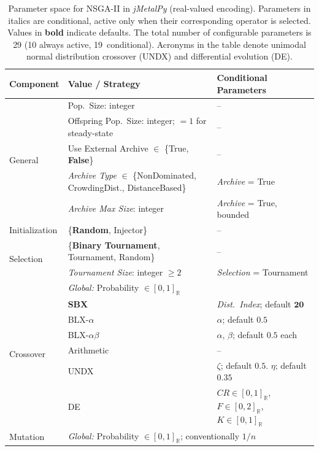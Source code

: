 \documentclass[journal]{IEEEtran}
\newcommand{\Realdomain}[1]{[#1]_{\mathbb{R}}}
\begin{document}
\begin{table}[htbp]
\centering
\caption{Parameter space for NSGA-II in \textit{jMetalPy} (real-valued encoding). Parameters in italics are conditional, active only when their corresponding operator is selected. Values in \textbf{bold} indicate defaults. The total number of configurable parameters is 29 (10 always active, 19~conditional). Acronyms in the table denote unimodal normal distribution crossover (UNDX) and differential evolution (DE).}
\label{tab:parameter_space_jmetalpy}
\begin{tabular}{lll}
\toprule
\textbf{Component} & \textbf{Value / Strategy} & \textbf{Conditional Parameters} \\ \midrule
\multirow{5}{*}{General} & Pop.\ Size: integer & -- \\
 & Offspring Pop.\ Size: integer; $= 1$ for steady-state & -- \\
 & Use External Archive $\in$ \{True, \textbf{False}\} & -- \\
 & \textit{Archive Type} $\in$ \{NonDominated, CrowdingDist., DistanceBased\} & \textit{Archive} = True \\
 & \textit{Archive Max Size}: integer & \textit{Archive} = True, bounded \\ \midrule
\multirow{1}{*}{Initialization} & \{\textbf{Random}, Injector\} & -- \\ \midrule
\multirow{2}{*}{Selection} & \{\textbf{Binary Tournament}, Tournament, Random\} & -- \\
 & \textit{Tournament Size}: integer $\geq 2$ & \textit{Selection} = Tournament \\ \midrule
\multirow{7}{*}{Crossover} & \multicolumn{2}{l}{\textit{Global:} Probability $\in \Realdomain{0, 1}$} \\
 & \textbf{SBX} & \textit{Dist.\ Index}; default $\mathbf{20}$ \\
 & BLX-$\alpha$ & $\alpha$; default $0.5$ \\
 & BLX-$\alpha\beta$ & $\alpha$, $\beta$; default $0.5$ each \\
 & Arithmetic & -- \\
 & UNDX & $\zeta$; default $0.5$. $\eta$; default $0.35$ \\
 & DE & $CR \in \Realdomain{0, 1}$, $F \in \Realdomain{0, 2}$, $K \in \Realdomain{0, 1}$ \\ \midrule
\multirow{7}{*}{Mutation} & \multicolumn{2}{l}{\textit{Global:} Probability $\in \Realdomain{0, 1}$; conventionally $1/n$} \\

\end{tabular}
\end{table}
\end{document}
